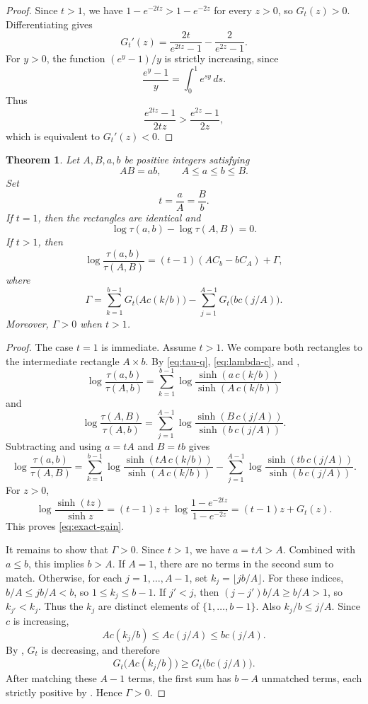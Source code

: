 \documentclass[11pt]{article}
\numberwithin{equation}{section}
\newtheorem{theorem}{Theorem}[section]
\newcommand{\dd}{\,d}
\begin{document}
\begin{proof}
Since $t>1$, we have $1-e^{-2tz}>1-e^{-2z}$ for every $z>0$, so $G_t(z)>0$. Differentiating gives
\[
  G_t'(z)=\frac{2t}{e^{2tz}-1}-\frac{2}{e^{2z}-1}.
\]
For $y>0$, the function $(e^y-1)/y$ is strictly increasing, since
\[
  \frac{e^y-1}{y}=\int_0^1e^{sy}\dd s.
\]
Thus
\[
  \frac{e^{2tz}-1}{2tz}>\frac{e^{2z}-1}{2z},
\]
which is equivalent to $G_t'(z)<0$.
\end{proof}

\begin{theorem}\label{thm:exact-gain}
Let $A,B,a,b$ be positive integers satisfying
\[
  AB=ab,\qquad A\le a\le b\le B.
\]
Set
\[
  t=\frac{a}{A}=\frac{B}{b}.
\]
If $t=1$, then the rectangles are identical and
\[
  \log\tau(a,b)-\log\tau(A,B)=0.
\]
If $t>1$, then
\begin{equation}\label{eq:exact-gain}
  \log\frac{\tau(a,b)}{\tau(A,B)}
  =
  (t-1)(AC_b-bC_A)+\Gamma,
\end{equation}
where
\[
  \Gamma
  =
  \sum_{k=1}^{b-1}G_t\bigl(Ac(k/b)\bigr)
  -
  \sum_{j=1}^{A-1}G_t\bigl(bc(j/A)\bigr).
\]
Moreover, $\Gamma>0$ when $t>1$.
\end{theorem}

\begin{proof}
The case $t=1$ is immediate. Assume $t>1$. We compare both rectangles to the intermediate rectangle $A\times b$. By \eqref{eq:tau-q}, \eqref{eq:lambda-c}, and ,
\[
  \log\frac{\tau(a,b)}{\tau(A,b)}
  =
  \sum_{k=1}^{b-1}
  \log\frac{\sinh(a\,c(k/b))}{\sinh(A\,c(k/b))}
\]
and
\[
  \log\frac{\tau(A,B)}{\tau(A,b)}
  =
  \sum_{j=1}^{A-1}
  \log\frac{\sinh(B\,c(j/A))}{\sinh(b\,c(j/A))}.
\]
Subtracting and using $a=tA$ and $B=tb$ gives
\[
  \log\frac{\tau(a,b)}{\tau(A,B)}
  =
  \sum_{k=1}^{b-1}
  \log\frac{\sinh(tA\,c(k/b))}{\sinh(A\,c(k/b))}
  -
  \sum_{j=1}^{A-1}
  \log\frac{\sinh(tb\,c(j/A))}{\sinh(b\,c(j/A))}.
\]
For $z>0$,
\[
  \log\frac{\sinh(tz)}{\sinh z}
  =
  (t-1)z+
  \log\frac{1-e^{-2tz}}{1-e^{-2z}}
  =
  (t-1)z+G_t(z).
\]
This proves \eqref{eq:exact-gain}.

It remains to show that $\Gamma>0$. Since $t>1$, we have $a=tA>A$. Combined with $a\le b$, this implies $b>A$. If $A=1$, there are no terms in the second sum to match. Otherwise, for each $j=1,\ldots,A-1$, set $k_j=\lfloor jb/A\rfloor$.
For these indices, $b/A\le jb/A<b$, so $1\le k_j\le b-1$. If $j'<j$, then $(j-j')b/A\ge b/A>1$, so $k_{j'}<k_j$. Thus the $k_j$ are distinct elements of $\{1,\ldots,b-1\}$. Also $k_j/b\le j/A$. Since $c$ is increasing,
\[
  A c(k_j/b)\le A c(j/A)\le b c(j/A).
\]
By , $G_t$ is decreasing, and therefore
\[
  G_t\bigl(Ac(k_j/b)\bigr)\ge G_t\bigl(bc(j/A)\bigr).
\]
After matching these $A-1$ terms, the first sum has $b-A$ unmatched terms, each strictly positive by . Hence $\Gamma>0$.
\end{proof}
\end{document}

